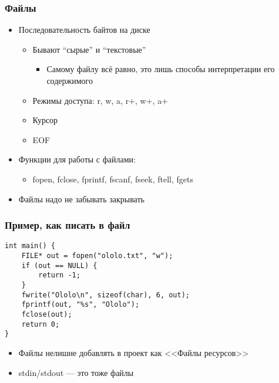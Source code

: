 \documentclass[xetex,mathserif,serif]{beamer}
\begin{document}
    \begin{frame}
        \frametitle{Файлы}
        \begin{itemize}
            \item Последовательность байтов на диске
            \begin{itemize}
                \item Бывают ``сырые'' и ``текстовые''
                \begin{itemize}
                    \item Самому файлу всё равно, это лишь способы интерпретации его содержимого
                \end{itemize}
                \item Режимы доступа: r, w, a, r+, w+, a+
                \item Курсор
                \item EOF
            \end{itemize}
            \item Функции для работы с файлами:
            \begin{itemize}
                \item fopen, fclose, fprintf, fscanf, fseek, ftell, fgets
            \end{itemize}
            \item Файлы надо не забывать закрывать
        \end{itemize}
    \end{frame}

    \begin{frame}[fragile]
        \frametitle{Пример, как писать в файл}
        \begin{verbatim}
int main() {
    FILE* out = fopen("ololo.txt", "w");
    if (out == NULL) {
        return -1;
    }
    fwrite("Ololo\n", sizeof(char), 6, out);
    fprintf(out, "%s", "Ololo");
    fclose(out);
    return 0;
}
        \end{verbatim}
        \begin{itemize}
            \item Файлы нелишне добавлять в проект как <<Файлы ресурсов>>
            \item stdin/stdout --- это тоже файлы
        \end{itemize}
    \end{frame}
\end{document}
